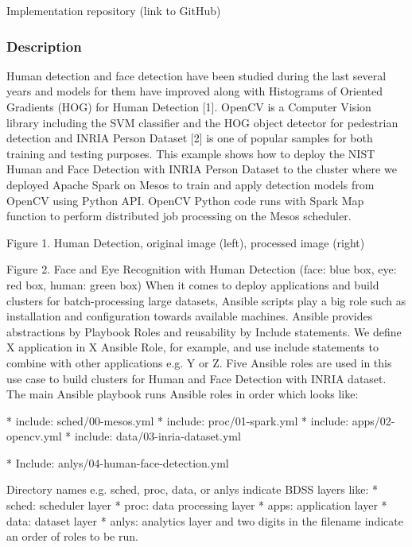 \documentclass[9pt,twocolumn,twoside]{styles/osajnl}
\begin{document}
Implementation repository (link to GitHub)
\subsubsection{Description}

Human detection and face detection have been studied during the last several years and models for them have improved along with Histograms of Oriented Gradients (HOG) for Human Detection [1]. OpenCV is a Computer Vision library including the SVM classifier and the HOG object detector for pedestrian detection and INRIA Person Dataset [2] is one of popular samples for both training and testing purposes. This example shows how to deploy the NIST Human and Face Detection with INRIA Person Dataset to the cluster where we deployed Apache Spark on Mesos to train and apply detection models from OpenCV using Python API. OpenCV Python code runs with Spark Map function to perform distributed job processing on the Mesos scheduler.
  
  

Figure 1. Human Detection, original image (left), processed image (right)
  
  

Figure 2. Face and Eye Recognition with Human Detection (face: blue box, eye: red box, human: green box)
When it comes to deploy applications and build clusters for batch-processing large datasets, Ansible scripts play a big role such as installation and configuration towards available machines. Ansible provides abstractions by Playbook Roles and reusability by Include statements. We define X application in X Ansible Role, for example, and use include statements to combine with other applications e.g. Y or Z. Five Ansible roles are used in this use case to build clusters for Human and Face Detection with INRIA dataset. The main Ansible playbook runs Ansible roles in order which looks like:



* include: sched/00-mesos.yml
* include: proc/01-spark.yml
* include: apps/02-opencv.yml
* include: data/03-inria-dataset.yml

* Include: anlys/04-human-face-detection.yml
	

Directory names e.g. sched, proc, data, or anlys indicate BDSS layers like:
* sched: scheduler layer
* proc: data processing layer
* apps: application layer
* data: dataset layer
* anlys: analytics layer
and two digits in the filename indicate an order of roles to be run. 
\end{document}
